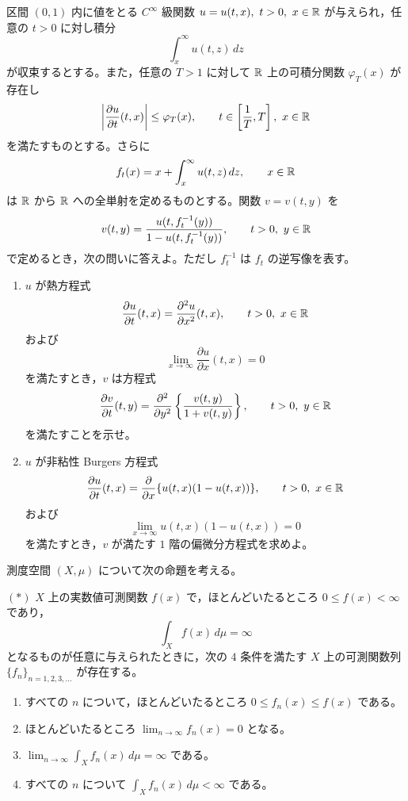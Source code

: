
区間 \((0,1)\) 内に値をとる \(C^\infty\) 級関数
\(u=u(t,x),\ t>0,\ x\in\mathbb{R}\) が与えられ，任意の \(t>0\) に対し積分
\[
  \int_x^\infty u(t,z)\,dz
\]
が収束するとする。また，任意の \(T>1\) に対して \(\mathbb{R}\) 上の可積分関数 \(\varphi_T(x)\) が存在し
\[
  \left|\frac{\partial u}{\partial t}(t,x)\right|\le \varphi_T(x),
  \qquad
  t\in\left[\frac1T,T\right],\ x\in\mathbb{R}
\]
を満たすものとする。さらに
\[
  f_t(x)=x+\int_x^\infty u(t,z)\,dz,\qquad x\in\mathbb{R}
\]
は \(\mathbb{R}\) から \(\mathbb{R}\) への全単射を定めるものとする。関数 \(v=v(t,y)\) を
\[
  v(t,y)=\frac{u(t,f_t^{-1}(y))}{1-u(t,f_t^{-1}(y))},
  \qquad t>0,\ y\in\mathbb{R}
\]
で定めるとき，次の問いに答えよ。ただし \(f_t^{-1}\) は \(f_t\) の逆写像を表す。

\begin{enumerate}
  \item \(u\) が熱方程式
  \[
    \frac{\partial u}{\partial t}(t,x)=\frac{\partial^2u}{\partial x^2}(t,x),
    \qquad t>0,\ x\in\mathbb{R}
  \]
  および
  \[
    \lim_{x\to\infty}\frac{\partial u}{\partial x}(t,x)=0
  \]
  を満たすとき，\(v\) は方程式
  \[
    \frac{\partial v}{\partial t}(t,y)
      =\frac{\partial^2}{\partial y^2}\left\{\frac{v(t,y)}{1+v(t,y)}\right\},
    \qquad t>0,\ y\in\mathbb{R}
  \]
  を満たすことを示せ。
  \item \(u\) が非粘性 Burgers 方程式
  \[
    \frac{\partial u}{\partial t}(t,x)
      =\frac{\partial}{\partial x}\{u(t,x)(1-u(t,x))\},
    \qquad t>0,\ x\in\mathbb{R}
  \]
  および
  \[
    \lim_{x\to\infty}u(t,x)(1-u(t,x))=0
  \]
  を満たすとき，\(v\) が満たす \(1\) 階の偏微分方程式を求めよ。
\end{enumerate}


測度空間 \((X,\mu)\) について次の命題を考える。

\((*)\) \(X\) 上の実数値可測関数 \(f(x)\) で，ほとんどいたるところ \(0\le f(x)<\infty\) であり，
\[
  \int_X f(x)\,d\mu=\infty
\]
となるものが任意に与えられたときに，次の \(4\) 条件を満たす \(X\) 上の可測関数列
\(\{f_n\}_{n=1,2,3,\ldots}\) が存在する。

\begin{enumerate}
  \item[(a)] すべての \(n\) について，ほとんどいたるところ \(0\le f_n(x)\le f(x)\) である。
  \item[(b)] ほとんどいたるところ \(\lim_{n\to\infty}f_n(x)=0\) となる。
  \item[(c)] \(\displaystyle \lim_{n\to\infty}\int_X f_n(x)\,d\mu=\infty\) である。
  \item[(d)] すべての \(n\) について \(\displaystyle \int_X f_n(x)\,d\mu<\infty\) である。
\end{enumerate}

